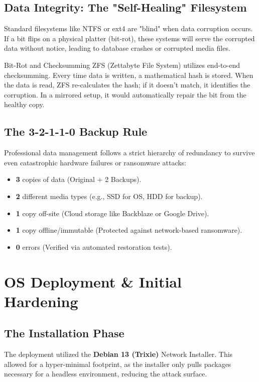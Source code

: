 \documentclass[12pt,a4paper,oneside]{book}
\begin{document}
\section{Data Integrity: The "Self-Healing" Filesystem}
Standard filesystems like NTFS or ext4 are "blind" when data corruption occurs. If a bit flips on a physical platter (bit-rot), these systems will serve the corrupted data without notice, leading to database crashes or corrupted media files. 

\begin{conceptbox}{Bit-Rot and Checksumming}
ZFS (Zettabyte File System) utilizes end-to-end checksumming. Every time data is written, a mathematical hash is stored. When the data is read, ZFS re-calculates the hash; if it doesn't match, it identifies the corruption. In a mirrored setup, it would automatically repair the bit from the healthy copy.
\end{conceptbox}

\section{The 3-2-1-1-0 Backup Rule}
Professional data management follows a strict hierarchy of redundancy to survive even catastrophic hardware failures or ransomware attacks:
\begin{itemize}
    \item \textbf{3} copies of data (Original + 2 Backups).
    \item \textbf{2} different media types (e.g., SSD for OS, HDD for backup).
    \item \textbf{1} copy off-site (Cloud storage like Backblaze or Google Drive).
    \item \textbf{1} copy offline/immutable (Protected against network-based ransomware).
    \item \textbf{0} errors (Verified via automated restoration tests).
\end{itemize}

\chapter{OS Deployment \& Initial Hardening}

\section{The Installation Phase}
The deployment utilized the \textbf{Debian 13 (Trixie)} Network Installer. This allowed for a hyper-minimal footprint, as the installer only pulls packages necessary for a headless environment, reducing the attack surface.
\end{document}
